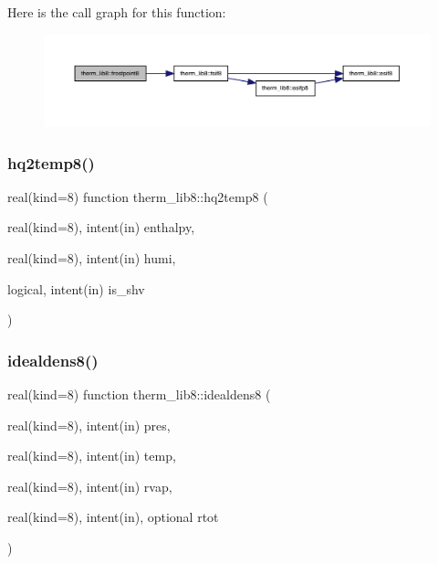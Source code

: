 Here is the call graph for this function\+:
\nopagebreak
\begin{figure}[H]
\begin{center}
\leavevmode
\includegraphics[width=350pt]{namespacetherm__lib8_a137ef754961bd0772247f311c22e160f_cgraph}
\end{center}
\end{figure}
\mbox{\label{namespacetherm__lib8_a1ffd2b0e4437b77b168fa1df97e641ca}} 
\subsubsection{\texorpdfstring{hq2temp8()}{hq2temp8()}}
{\footnotesize\ttfamily real(kind=8) function therm\+\_\+lib8\+::hq2temp8 (\begin{DoxyParamCaption}\item[{real(kind=8), intent(in)}]{enthalpy,  }\item[{real(kind=8), intent(in)}]{humi,  }\item[{logical, intent(in)}]{is\+\_\+shv }\end{DoxyParamCaption})}

\mbox{\label{namespacetherm__lib8_a18ba1889218ff1cf51e4b8ec9c612f02}} 
\subsubsection{\texorpdfstring{idealdens8()}{idealdens8()}}
{\footnotesize\ttfamily real(kind=8) function therm\+\_\+lib8\+::idealdens8 (\begin{DoxyParamCaption}\item[{real(kind=8), intent(in)}]{pres,  }\item[{real(kind=8), intent(in)}]{temp,  }\item[{real(kind=8), intent(in)}]{rvap,  }\item[{real(kind=8), intent(in), optional}]{rtot }\end{DoxyParamCaption})}

